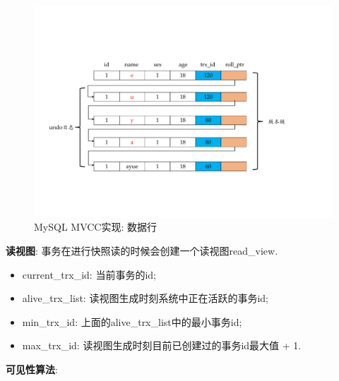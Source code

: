 \begin{figure}[H]
    \centering
    \includegraphics[width=.8\textwidth]{figure/MVCC.pdf}
    \caption{MySQL MVCC实现: 数据行}
\end{figure}

\textbf{读视图}: 事务在进行快照读的时候会创建一个读视图read\_view.
\begin{itemize}
  \item current\_trx\_id: 当前事务的id;
  \item alive\_trx\_list: 读视图生成时刻系统中正在活跃的事务id;
  \item min\_trx\_id: 上面的alive\_trx\_list中的最小事务id;
  \item max\_trx\_id: 读视图生成时刻目前已创建过的事务id最大值 + 1.
\end{itemize}


\textbf{可见性算法}: 

